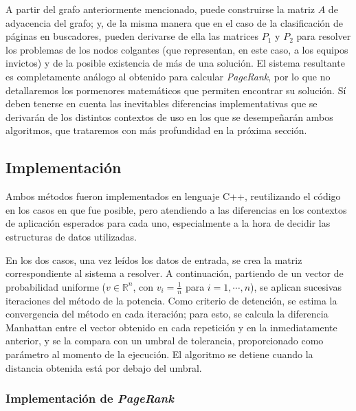         A partir del grafo anteriormente mencionado, puede construirse la matriz $A$ de adyacencia del grafo; y, de la misma manera que en el caso de la clasificación de páginas en buscadores, pueden derivarse de ella las matrices $P_1$ y $P_2$ para resolver los problemas de los nodos colgantes (que representan, en este caso, a los equipos invictos) y de la posible existencia de más de una solución. El sistema resultante es completamente análogo al obtenido para calcular \emph{PageRank}, por lo que no detallaremos los pormenores matemáticos que permiten encontrar su solución. Sí deben tenerse en cuenta las inevitables diferencias implementativas que se derivarán de los distintos contextos de uso en los que se desempeñarán ambos algoritmos, que trataremos con más profundidad en la próxima sección.

    \subsection{Implementación}

    Ambos métodos fueron implementados en lenguaje C++, reutilizando el código en los casos en que fue posible, pero atendiendo a las diferencias en los contextos de aplicación esperados para cada uno, especialmente a la hora de decidir las estructuras de datos utilizadas.

    En los dos casos, una vez leídos los datos de entrada, se crea la matriz correspondiente al sistema a resolver. A continuación, partiendo de un vector de probabilidad uniforme ($v \in \mathbb{R}^n$, con $v_i = \frac{1}{n}$ para $i = 1, \cdots, n$), se aplican sucesivas iteraciones del método de la potencia. Como criterio de detención, se estima la convergencia del método en cada iteración; para esto, se calcula la diferencia Manhattan entre el vector obtenido en cada repetición y en la inmediatamente anterior, y se la compara con un umbral de tolerancia, proporcionado como parámetro al momento de la ejecución. El algoritmo se detiene cuando la distancia obtenida está por debajo del umbral.

        \subsubsection{Implementación de \emph{PageRank}}

